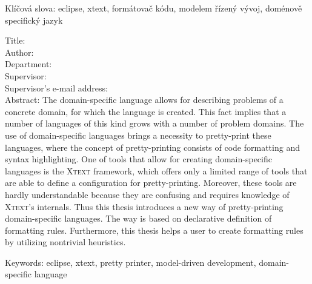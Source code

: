 \documentclass[12pt,notitlepage,a4paper]{report}
\begin{document}
\vspace{5mm}

\noindent Klíčová slova:  eclipse, xtext, formátovač kódu, modelem řízený vývoj, doménově specifický jazyk

\vspace{10mm}

\noindent
Title: \insertenglishtitle\\
Author: \insertauthor\\
Department: \insertenglishdepartment\\
Supervisor: \insertsupervisor\\
Supervisor's e-mail address: \insertsupervisorsemail\\

\noindent Abstract: The domain-specific language allows  for  describing problems of a concrete domain, for which the language is created. This fact implies that a number of languages of this kind grows with a number of problem domains. The use of domain-specific languages brings a necessity to pretty-print these languages, where the concept of pretty-printing consists of code formatting and syntax highlighting.  One of tools that allow for creating domain-specific languages is the \textsc{Xtext} framework, which offers only a limited range of tools that are able to define a configuration for pretty-printing. Moreover, these tools are hardly understandable because they are confusing and requires knowledge of \textsc{Xtext}'s internals. Thus this thesis introduces  a new way of pretty-printing domain-specific languages. The way is based on declarative definition of formatting rules. Furthermore, this thesis helps a user to create formatting rules by utilizing nontrivial heuristics.

\vspace{5mm}

\noindent Keywords: eclipse, xtext, pretty printer,  model-driven development,  domain-specific language

\newpage



\newenvironment{memberlist}{
\begin{description}
	\setlength{\parsep}{0mm}
	\setlength{\parskip}{0mm}
	\setlength{\itemsep}{1mm}
}
{\end{description}}

\newenvironment{cdcontentlist}{
\begin{description}[font=\normalfont\texttt]
	\setlength{\parsep}{0mm}
	\setlength{\parskip}{0mm}
	\setlength{\itemsep}{1mm}
}
{\end{description}}
\end{document}
